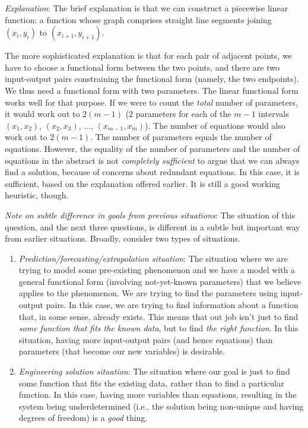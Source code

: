 \documentclass[10pt]{amsart}
\begin{document}
\begin{enumerate}
  {\em Explanation}: The brief explanation is that we can construct a
  piecewise linear function: a function whose graph comprises straight
  line segments joining $(x_i,y_i)$ to $(x_{i+1},y_{i+1})$.

  The more sophisticated explanation is that for each pair of adjacent
  points, we have to choose a functional form between the two points,
  and there are two input-output pairs constraining the functional
  form (namely, the two endpoints). We thus need a functional form
  with two parameters. The linear functional form works well for that
  purpose. If we were to count the {\em total} number of parameters,
  it would work out to $2(m - 1)$ ($2$ parameters for each of the $m -
  1$ intervals $(x_1,x_2)$, $(x_2,x_3)$, $\dots$,
  $(x_{m-1},x_m)$). The number of equations would also work out to
  $2(m - 1)$. The number of parameters equals the number of
  equations. However, the equality of the number of parameters and the
  number of equations in the abstract is not {\em completely
    sufficient} to argue that we can always find a solution, because
  of concerns about redundant equations. In this case, it is
  sufficient, based on the explanation offered earlier. It is still a
  good working heuristic, though.

  {\em Note on subtle difference in goals from previous situations}:
  The situation of this question, and the next three questions, is
  different in a subtle but important way from earlier
  situations. Broadly, consider two types of situations.

  \begin{enumerate}
  \item {\em Prediction/forecasting/extrapolation situation}: The
    situation where we are trying to model some pre-existing
    phenomenon and we have a model with a general functional form
    (involving not-yet-known parameters) that we believe applies to
    the phenomenon. We are trying to find the parameters using
    input-output pairs. In this case, we are trying to find
    information about a function that, in some sense, already
    exists. This means that out job isn't just to find {\em some
      function that fits the known data}, but to find {\em the right
      function}. In this situation, having more input-output pairs
    (and hence equations) than parameters (that become our new
    variables) is desirable.
  \item {\em Engineering solution situation}: The situation where our
    goal is just to find some function that fits the existing data,
    rather than to find a particular function. In this case, having
    more variables than equations, resulting in the system being
    underdetermined (i.e., the solution being non-unique and having
    degrees of freedom) is a {\em good} thing.
  \end{enumerate}


\end{enumerate}
\end{document}
